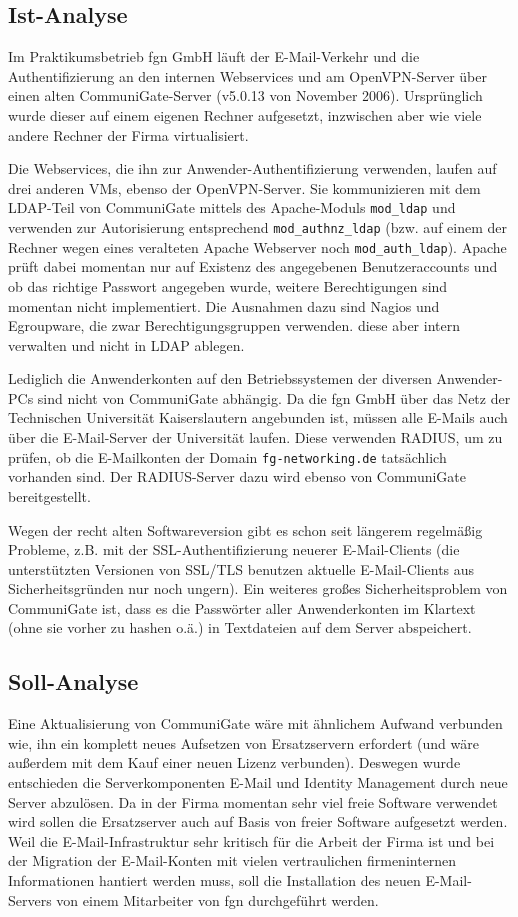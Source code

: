 \documentclass[11pt,a4paper,titlepage=firstiscover,headsepline,bibtotoc]{scrartcl} %
\begin{document}
\subsection{Ist-Analyse}\label{sec:Ist-Analyse}
Im Praktikumsbetrieb fgn GmbH läuft der E-Mail-Verkehr und die Authentifizierung an den internen Webservices und am OpenVPN-Server über einen alten CommuniGate-Server (v5.0.13 von November 2006). Ursprünglich wurde dieser auf einem eigenen Rechner aufgesetzt, inzwischen aber wie viele andere Rechner der Firma virtualisiert. 

Die Webservices, die ihn zur Anwender-Authentifizierung verwenden, laufen auf drei anderen VMs, ebenso der OpenVPN-Server. Sie kommunizieren mit dem LDAP-Teil von CommuniGate mittels des Apache-Moduls \texttt{mod\_ldap} und verwenden zur Autorisierung entsprechend \texttt{mod\_authnz\_ldap} (bzw. auf einem der Rechner wegen eines veralteten Apache Webserver noch \texttt{mod\_auth\_ldap}). Apache prüft dabei momentan nur auf Existenz des angegebenen Benutzeraccounts und ob das richtige Passwort angegeben wurde, weitere Berechtigungen sind momentan nicht implementiert. Die Ausnahmen dazu sind Nagios und Egroupware, die zwar Berechtigungsgruppen verwenden. diese aber intern verwalten und nicht in LDAP ablegen.

Lediglich die Anwenderkonten auf den Betriebssystemen der diversen Anwender-PCs sind nicht von CommuniGate abhängig. Da die fgn GmbH über das Netz der Technischen Universität Kaiserslautern angebunden ist, müssen alle E-Mails auch über die E-Mail-Server der Universität laufen. Diese verwenden RADIUS, um zu prüfen, ob die E-Mailkonten der Domain \texttt{fg-networking.de} tatsächlich vorhanden sind. Der RADIUS-Server dazu wird ebenso von CommuniGate bereitgestellt. 

Wegen der recht alten Softwareversion gibt es schon seit längerem regelmäßig Probleme, z.B. mit der SSL-Authentifizierung neuerer E-Mail-Clients (die unterstützten Versionen von SSL/TLS benutzen aktuelle E-Mail-Clients aus Sicherheitsgründen nur noch ungern). Ein weiteres großes Sicherheitsproblem von CommuniGate ist, dass es die Passwörter aller Anwenderkonten im Klartext (ohne sie vorher zu hashen o.ä.) in Textdateien auf dem Server abspeichert.

\subsection{Soll-Analyse}
Eine Aktualisierung von CommuniGate wäre mit ähnlichem Aufwand verbunden wie, ihn ein komplett neues Aufsetzen von Ersatzservern erfordert (und wäre außerdem mit dem Kauf einer neuen Lizenz verbunden). Deswegen wurde entschieden die Serverkomponenten E-Mail und Identity Management durch neue Server abzulösen. Da in der Firma momentan sehr viel freie Software verwendet wird sollen die Ersatzserver auch auf Basis von freier Software aufgesetzt werden. Weil die E-Mail-Infrastruktur sehr kritisch für die Arbeit der Firma ist und bei der Migration der E-Mail-Konten mit vielen vertraulichen firmeninternen Informationen hantiert werden muss, soll die Installation des neuen E-Mail-Servers von einem Mitarbeiter von fgn durchgeführt werden.
\end{document}
